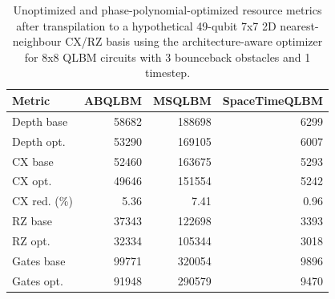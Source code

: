\begin{table}[ht]
\centering
\begin{tabular}{lrrr}
\hline
Metric & ABQLBM & MSQLBM & SpaceTimeQLBM \\
\hline
Depth base & 58682 & 188698 & 6299 \\
Depth opt. & 53290 & 169105 & 6007 \\
CX base & 52460 & 163675 & 5293 \\
CX opt. & 49646 & 151554 & 5242 \\
CX red. (\%) & 5.36 & 7.41 & 0.96 \\
RZ base & 37343 & 122698 & 3393 \\
RZ opt. & 32334 & 105344 & 3018 \\
Gates base & 99771 & 320054 & 9896 \\
Gates opt. & 91948 & 290579 & 9470 \\
\hline
\end{tabular}
\caption{Unoptimized and phase-polynomial-optimized resource metrics after transpilation to a hypothetical 49-qubit 7x7 2D nearest-neighbour CX/RZ basis using the architecture-aware optimizer for 8x8 QLBM circuits with 3 bounceback obstacles and 1 timestep.}
\label{tab:phase-poly-optimization-comparison-8x8-obs3-t1-2d-grid}
\end{table}
